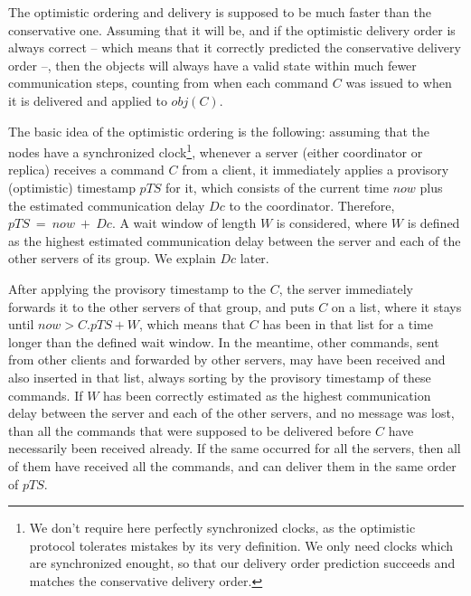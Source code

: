 \documentclass[times, 10pt]{article}
\begin{document}
The optimistic ordering and delivery is supposed to be much faster than the conservative one. Assuming that it will be, and if the optimistic delivery order is always correct -- which means that it correctly predicted the conservative delivery order --, then the objects will always have a valid state within much fewer communication steps, counting from when each command $C$ was issued to when it is delivered and applied to $obj(C)$.

The basic idea of the optimistic ordering is the following: assuming that the nodes have a synchronized clock\footnote{We don't require here perfectly synchronized clocks, as the optimistic protocol tolerates mistakes by its very definition. We only need clocks which are synchronized enought, so that our delivery order prediction succeeds and matches the conservative delivery order.}, whenever a server (either coordinator or replica) receives a command $C$ from a client, it immediately applies a provisory (optimistic) timestamp $pTS$ for it, which consists of the current time $now$ plus the estimated communication delay $Dc$ to the coordinator. Therefore, $pTS~=~now~+~Dc$. A wait window of length $W$ is considered, where $W$ is defined as the highest estimated communication delay between the server and each of the other servers of its group. We explain $Dc$ later.

After applying the provisory timestamp to the $C$, the server immediately forwards it to the other servers of that group, and puts $C$ on a list, where it stays until $now > C.pTS + W$, which means that $C$ has been in that list for a time longer than the defined wait window. In the meantime, other commands, sent from other clients and forwarded by other servers, may have been received and also inserted in that list, always sorting by the provisory timestamp of these commands. If $W$ has been correctly estimated as the highest communication delay between the server and each of the other servers, and no message was lost, than all the commands that were supposed to be delivered before $C$ have necessarily been received already. If the same occurred for all the servers, then all of them have received all the commands, and can deliver them in the same order of $pTS$.
\end{document}
